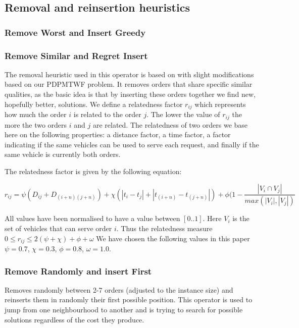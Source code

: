 \documentclass[a4paper,10pt]{article}
\begin{document}
\subsection{Removal and reinsertion heuristics}
\subsubsection{Remove Worst and Insert Greedy}
\subsubsection{Remove Similar and Regret Insert}
The removal heuristic used in this operator is based on \citet{shaw97} with slight modifications based on our PDPMTWF problem. 
It removes orders that share specific similar qualities, as the basic idea is that by inserting these orders together we find new, hopefully better, solutions.
We define a relatedness factor $r_{ij}$ which represents how much the order $i$ is related to the order $j$. 
The lower the value of $r_{ij}$ the more the two orders $i$ and $j$ are related.
The relatedness of two orders we base here on the following properties: 
a distance factor, a time factor, a factor indicating if the same vehicles can be used to serve each request, and finally if the same vehicle is currently both orders.

The relatedness factor is given by the following equation:

\begin{equation}
\label{relatedness}
    r_{ij} = \psi ( D_{i j} + D_{(i+n)(j+n)}) + \chi ( |t_i - t_j| + |t_{(i+n)} - t_{(j+n)}|) + \phi (1-\dfrac{|V_i\cap V_j|}{max(|V_i|, |V_j|)}
\end{equation}

All values have been normalised to have a value between $[0..1]$. 
Here $V_i$ is the set of vehicles that can serve order $i$. 
Thus the relatedness measure $0\leq r_{ij} \leq 2(\psi + \chi) + \phi + \omega$
We have chosen the following values in this paper $\psi=0.7$, $\chi = 0.3$, $\phi=0.8$, $\omega=1.0$. 

\subsubsection{Remove Randomly and insert First}
Removes randomly between 2-7 orders (adjusted to the instance size) and reinserts them in randomly their first possible position. 
This operator is used to jump from one neighbourhood to another and is trying to search for possible solutions regardless of the cost they produce.




\end{document}
